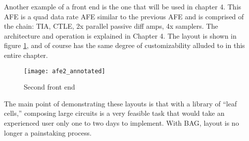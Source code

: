 Another example of a front end is the one that will be used in chapter 4. This AFE is a quad data rate AFE similar to the previous AFE and is comprised of the chain: TIA, CTLE, 2x parallel passive diff amps, 4x samplers. The architecture and operation is explained in Chapter 4. The layout is shown in figure \ref{fig:afe2}, and of course has the same degree of customizability alluded to in this entire chapter.
\begin{figure}[h]
\centering
\texttt{[image: afe2\_annotated]}
\caption{Second front end}
\label{fig:afe2}
\end{figure}
The main point of demonstrating these layouts is that with a library of ``leaf cells,'' composing large circuits is a very feasible task that would take an experienced user only one to two days to implement. With BAG, layout is no longer a painstaking process.

